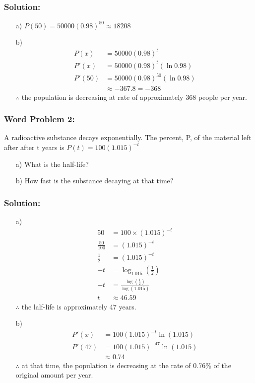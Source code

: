 \documentclass{article}
\begin{document}
\subsubsection*{Solution: }
\begin{enumerate}
    \item[a)] $P(50)=50000(0.98)^{50} \approx 18208$
    \item[b)] 
    \begin{align*}
        P(x)&=50000(0.98)^t\\
        P'(x)&=50000(0.98)^t(\ln 0.98)\\
        P'(50)&=50000(0.98)^{50}(\ln 0.98)\\
        &\approx-367.8 = -368
    \end{align*} 
$\therefore$ the population is decreasing at rate of approximately 368 people per year.    
\end{enumerate}
\subsubsection*{Word Problem 2:}
A radioactive substance decays exponentially. The percent, P, of the material left after after t years is $P(t)=100(1.015)^{-t}$
\begin{enumerate}
    \item[a)] What is the half-life?
    \item[b)] How fast is the substance decaying at that time?
\end{enumerate}
\subsubsection*{Solution: }
\begin{enumerate}
    \item[a)]
    \begin{align*}
        50 &= 100 \times (1.015)^{-t}\\
        \frac{50}{100} &= (1.015)^{-t}\\
        \frac{1}{2} &= (1.015)^{-t}\\
        -t &= \log_{1.015}\left(\frac{1}{2}\right)\\
        -t &= \frac{\log\left(\frac{1}{2}\right)}{\log(1.015)}\\
        t &\approx 46.59
    \end{align*}
    $\therefore$ the lalf-life is approximately 47 years.
    \item[b)] 
    \begin{align*}
        P'(x)&=100(1.015)^{-t}\ln (1.015)\\
        P'(47)&=100(1.015)^{-47}\ln (1.015)\\
        &\approx 0.74
    \end{align*} 
    $\therefore$ at that time, the population is decreasing at the rate of 0.76\% of the original amount per year.
\end{enumerate}
\newpage 
\end{document}
